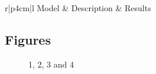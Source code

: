 \centering	
\begin{table}[H]\tiny
	\caption{}	
	\begin{tabular}{r|p{4cm}|l}
		\hline	
		Model & Description & Results \\
		\hline 
		\hline 
	\end{tabular}
\end{table}

\subsection{Figures}

\begin{figure}[H]
	\centering
	\begin{minipage}[b]{0.5\linewidth}
	\end{minipage}\hfill
	\begin{minipage}[b]{0.5\linewidth}
	\end{minipage}\hfill	
	\begin{minipage}[b]{0.5\linewidth}
	\end{minipage}\hfill
	\begin{minipage}[b]{0.5\linewidth}
	\end{minipage}\hfill
	\caption{1, 2, 3 and 4}
	\label{fig:Figure1}
\end{figure} 



\begin{thebibliography}{00}

\end{thebibliography}


